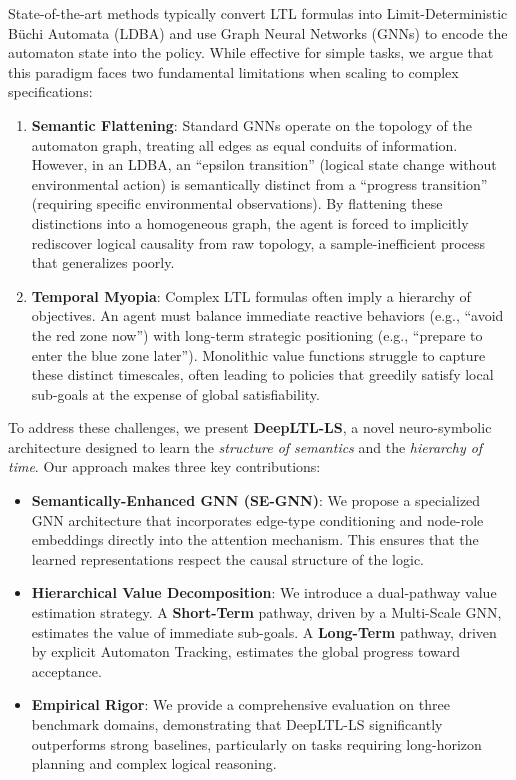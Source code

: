 \documentclass{article}
\begin{document}
State-of-the-art methods typically convert LTL formulas into Limit-Deterministic Büchi Automata (LDBA) and use Graph Neural Networks (GNNs) to encode the automaton state into the policy. While effective for simple tasks, we argue that this paradigm faces two fundamental limitations when scaling to complex specifications:

\begin{enumerate}
    \item \textbf{Semantic Flattening}: Standard GNNs operate on the topology of the automaton graph, treating all edges as equal conduits of information. However, in an LDBA, an ``epsilon transition'' (logical state change without environmental action) is semantically distinct from a ``progress transition'' (requiring specific environmental observations). By flattening these distinctions into a homogeneous graph, the agent is forced to implicitly rediscover logical causality from raw topology, a sample-inefficient process that generalizes poorly.
    \item \textbf{Temporal Myopia}: Complex LTL formulas often imply a hierarchy of objectives. An agent must balance immediate reactive behaviors (e.g., ``avoid the red zone now'') with long-term strategic positioning (e.g., ``prepare to enter the blue zone later''). Monolithic value functions struggle to capture these distinct timescales, often leading to policies that greedily satisfy local sub-goals at the expense of global satisfiability.
\end{enumerate}

To address these challenges, we present \textbf{DeepLTL-LS}, a novel neuro-symbolic architecture designed to learn the \textit{structure of semantics} and the \textit{hierarchy of time}. Our approach makes three key contributions:
\begin{itemize}
    \item \textbf{Semantically-Enhanced GNN (SE-GNN)}: We propose a specialized GNN architecture that incorporates edge-type conditioning and node-role embeddings directly into the attention mechanism. This ensures that the learned representations respect the causal structure of the logic.
    \item \textbf{Hierarchical Value Decomposition}: We introduce a dual-pathway value estimation strategy. A \textbf{Short-Term} pathway, driven by a Multi-Scale GNN, estimates the value of immediate sub-goals. A \textbf{Long-Term} pathway, driven by explicit Automaton Tracking, estimates the global progress toward acceptance.
    \item \textbf{Empirical Rigor}: We provide a comprehensive evaluation on three benchmark domains, demonstrating that DeepLTL-LS significantly outperforms strong baselines, particularly on tasks requiring long-horizon planning and complex logical reasoning.
\end{itemize}
\end{document}
